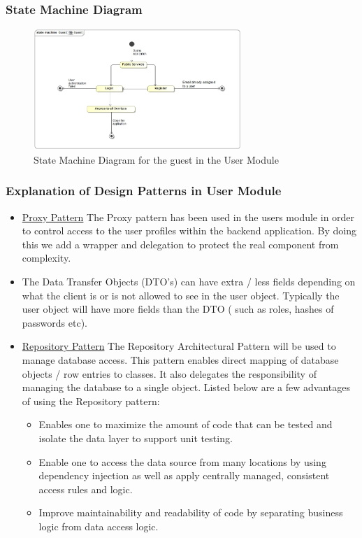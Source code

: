 \documentclass[runningheads,a4paper]{article}
\begin{document}
\subsubsection{State Machine Diagram}
\begin{figure}[H]
   	\centering
   	\includegraphics[width=0.7\textwidth]{Guest_State_Diagram.jpg}
   	\caption{State Machine Diagram for the guest in the User Module}
\end{figure}

\subsubsection {Explanation of Design Patterns in User Module}
\begin{itemize}
\item \underline{Proxy Pattern} The Proxy pattern has been used in the users module in order to control access to the user profiles within the backend application. By doing this we add a wrapper and delegation to protect the real component from complexity. 

\item The Data Transfer Objects (DTO's)  can have extra / less fields depending on what the client is or is not allowed to see in the user object. Typically the user object will have more fields than the DTO ( such as roles, hashes of passwords etc). 

\item \underline{Repository Pattern} The Repository Architectural Pattern will be used to manage database access. This pattern enables direct mapping of database objects / row entries to classes. It also delegates the responsibility of managing the database to a single object. Listed below are a few advantages of using the Repository pattern:
	\begin{itemize}
		\item Enables one to maximize the amount of code that can be tested and isolate the data layer to support unit testing. 
		\item Enable one to access the data source from many locations by using dependency injection as well as apply centrally managed, consistent access rules and logic.
		\item Improve maintainability and readability of code by separating business logic from data access logic.  
	\end{itemize} 
\end{itemize}
\end{document}
